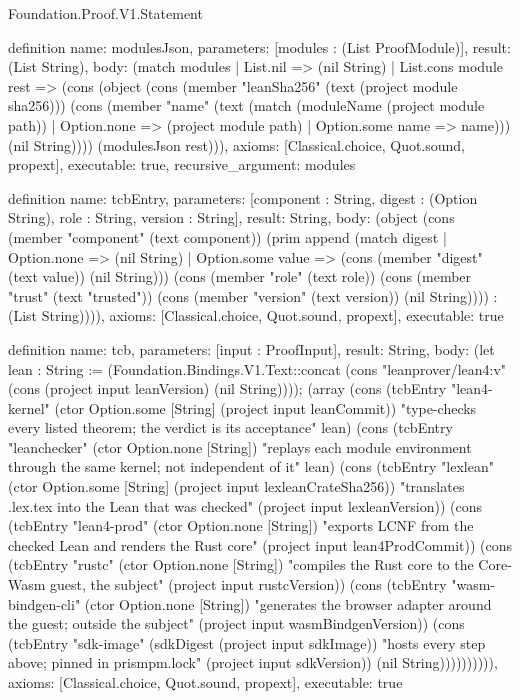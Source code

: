 \begin{lexlean}{Foundation.Proof.V1.Statement}
\begin{semanticmodule}
definition{
  name: modulesJson,
  parameters: [modules : (List ProofModule)],
  result: (List String),
  body: (match modules
    | List.nil => (nil String)
    | List.cons module rest => (cons (object (cons (member "leanSha256" (text (project module sha256))) (cons (member "name" (text (match (moduleName (project module path))
      | Option.none => (project module path)
      | Option.some name => name))) (nil String)))) (modulesJson rest))),
  axioms: [Classical.choice, Quot.sound, propext],
  executable: true,
  recursive_argument: modules
}

definition{
  name: tcbEntry,
  parameters: [component : String, digest : (Option String), role : String, version : String],
  result: String,
  body: (object (cons (member "component" (text component)) (prim append (match digest
    | Option.none => (nil String)
    | Option.some value => (cons (member "digest" (text value)) (nil String))) (cons (member "role" (text role)) (cons (member "trust" (text "trusted")) (cons (member "version" (text version)) (nil String)))) : (List String)))),
  axioms: [Classical.choice, Quot.sound, propext],
  executable: true
}

definition{
  name: tcb,
  parameters: [input : ProofInput],
  result: String,
  body: (let lean : String := (Foundation.Bindings.V1.Text::concat (cons "leanprover/lean4:v" (cons (project input leanVersion) (nil String)))); (array (cons (tcbEntry "lean4-kernel" (ctor Option.some [String] (project input leanCommit)) "type-checks every listed theorem; the verdict is its acceptance" lean) (cons (tcbEntry "leanchecker" (ctor Option.none [String]) "replays each module environment through the same kernel; not independent of it" lean) (cons (tcbEntry "lexlean" (ctor Option.some [String] (project input lexleanCrateSha256)) "translates .lex.tex into the Lean that was checked" (project input lexleanVersion)) (cons (tcbEntry "lean4-prod" (ctor Option.none [String]) "exports LCNF from the checked Lean and renders the Rust core" (project input lean4ProdCommit)) (cons (tcbEntry "rustc" (ctor Option.none [String]) "compiles the Rust core to the Core-Wasm guest, the subject" (project input rustcVersion)) (cons (tcbEntry "wasm-bindgen-cli" (ctor Option.none [String]) "generates the browser adapter around the guest; outside the subject" (project input wasmBindgenVersion)) (cons (tcbEntry "sdk-image" (sdkDigest (project input sdkImage)) "hosts every step above; pinned in prismpm.lock" (project input sdkVersion)) (nil String)))))))))),
  axioms: [Classical.choice, Quot.sound, propext],
  executable: true
}


\end{semanticmodule}
\end{lexlean}
